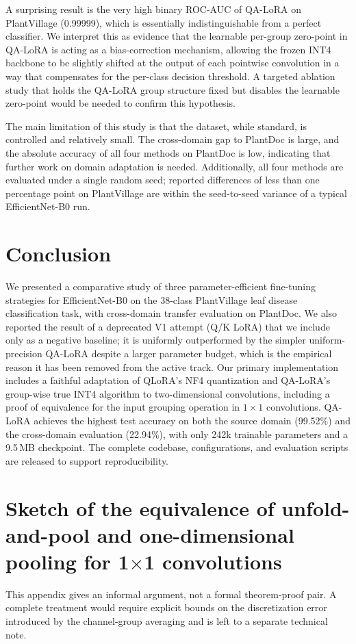 \documentclass[conference]{IEEEtran}
\begin{document}
A surprising result is the very high binary ROC-AUC of QA-LoRA on PlantVillage (0.99999), which is essentially indistinguishable from a perfect classifier. We interpret this as evidence that the learnable per-group zero-point in QA-LoRA is acting as a bias-correction mechanism, allowing the frozen INT4 backbone to be slightly shifted at the output of each pointwise convolution in a way that compensates for the per-class decision threshold. A targeted ablation study that holds the QA-LoRA group structure fixed but disables the learnable zero-point would be needed to confirm this hypothesis.

The main limitation of this study is that the dataset, while standard, is controlled and relatively small. The cross-domain gap to PlantDoc is large, and the absolute accuracy of all four methods on PlantDoc is low, indicating that further work on domain adaptation is needed. Additionally, all four methods are evaluated under a single random seed; reported differences of less than one percentage point on PlantVillage are within the seed-to-seed variance of a typical EfficientNet-B0 run.

\section{Conclusion}
We presented a comparative study of three parameter-efficient fine-tuning strategies for EfficientNet-B0 on the 38-class PlantVillage leaf disease classification task, with cross-domain transfer evaluation on PlantDoc. We also reported the result of a deprecated V1 attempt (Q/K LoRA) that we include only as a negative baseline; it is uniformly outperformed by the simpler uniform-precision QA-LoRA despite a larger parameter budget, which is the empirical reason it has been removed from the active track. Our primary implementation includes a faithful adaptation of QLoRA's NF4 quantization and QA-LoRA's group-wise true INT4 algorithm to two-dimensional convolutions, including a proof of equivalence for the input grouping operation in $1\times 1$ convolutions. QA-LoRA achieves the highest test accuracy on both the source domain (99.52\%) and the cross-domain evaluation (22.94\%), with only 242k trainable parameters and a 9.5\,MB checkpoint. The complete codebase, configurations, and evaluation scripts are released to support reproducibility.

\appendix
\section{Sketch of the equivalence of unfold-and-pool and one-dimensional pooling for 1$\times$1 convolutions}\label{app:proof}
This appendix gives an informal argument, not a formal theorem-proof pair. A complete treatment would require explicit bounds on the discretization error introduced by the channel-group averaging and is left to a separate technical note.
\end{document}
